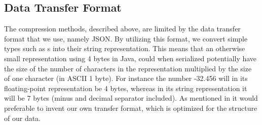 \subsection{Data Transfer Format}
The compression methods, described above, are limited by the data transfer format that we use, namely JSON. By utilizing this format, we convert simple types such as s into their string representation. This means that an otherwise small representation using 4 bytes in Java, could when serialized potentially have the size of the number of characters in the representation multiplied by the size of one character (in ASCII 1 byte). For instance the number -32.456 will in its floating-point representation be 4 bytes, whereas in its string representation it will be 7 bytes (minus and decimal separator included). As mentioned in  it would preferable to invent our own transfer format, which is optimized for the structure of our data. 
